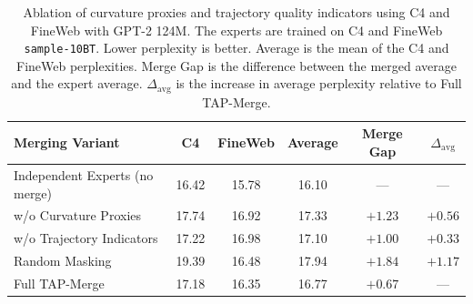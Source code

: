 \begin{table}[t]
\centering
\small
\caption{Ablation of curvature proxies and trajectory quality indicators using C4 and FineWeb with GPT-2 124M. The experts are trained on C4 and FineWeb \texttt{sample-10BT}. Lower perplexity is better. Average is the mean of the C4 and FineWeb perplexities. Merge Gap is the difference between the merged average and the expert average. $\Delta_{\mathrm{avg}}$ is the increase in average perplexity relative to Full TAP-Merge.}
\label{tab:ablation_curvature_trajectory}
\begin{tabular}{lccccc}
\toprule
\textbf{Merging Variant}
& \textbf{C4}
& \textbf{FineWeb}
& \textbf{Average}
& \textbf{Merge Gap}
& $\Delta_{\mathrm{avg}}$ \\
\midrule
Independent Experts (no merge)
& 16.42 & 15.78 & 16.10 & --- & --- \\
\midrule
w/o Curvature Proxies
& 17.74 & 16.92 & 17.33 & $+1.23$ & $+0.56$ \\
w/o Trajectory Indicators
& 17.22 & 16.98 & 17.10 & $+1.00$ & $+0.33$ \\
Random Masking
& 19.39 & 16.48 & 17.94 & $+1.84$ & $+1.17$ \\
\midrule
Full TAP-Merge
& 17.18 & 16.35 & 16.77 & $+0.67$ & --- \\
\bottomrule
\end{tabular}
\end{table}
